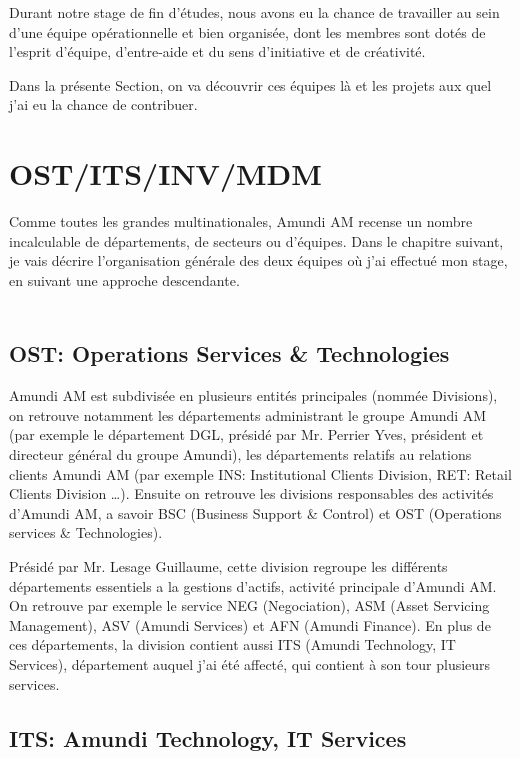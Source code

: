 \par Durant notre stage de fin d’études, nous avons eu la chance de travailler au sein d’une équipe opérationnelle et bien organisée, dont les membres sont dotés de l’esprit d’équipe, d’entre-aide et du sens d’initiative et de créativité.
\par Dans la présente Section, on va découvrir ces équipes là et les projets aux quel j'ai eu la chance de contribuer.

\begingroup
\let\clearpage\relax
\chapter{OST/ITS/INV/MDM}
\endgroup

\par Comme toutes les grandes multinationales, Amundi AM recense un nombre incalculable de départements, de secteurs ou d'équipes. Dans le chapitre suivant, je vais décrire l’organisation générale des deux équipes où j’ai effectué mon stage, en suivant une approche descendante.
\\~\\

\section{OST: Operations Services \& Technologies}

\par Amundi AM est subdivisée en plusieurs entités principales (nommée Divisions), on retrouve notamment les départements administrant le groupe Amundi AM (par exemple le département DGL, présidé par Mr. Perrier Yves, président et directeur général du groupe Amundi), les départements relatifs au relations clients Amundi AM (par exemple INS: Institutional Clients Division, RET: Retail Clients Division \dots). Ensuite on retrouve les divisions responsables des activités d'Amundi AM, a savoir BSC (Business Support \& Control) et OST (Operations services \& Technologies). 
\par Présidé par Mr. Lesage Guillaume, cette division regroupe les différents départements essentiels a la gestions d'actifs, activité principale d'Amundi AM. On retrouve par exemple le service NEG (Negociation), ASM (Asset Servicing Management), ASV (Amundi Services) et AFN (Amundi Finance). En plus de ces départements, la division contient aussi ITS (Amundi Technology, IT Services), département auquel j'ai été affecté, qui contient à son tour plusieurs services. 
\clearpage
\section{ITS: Amundi Technology, IT Services}

